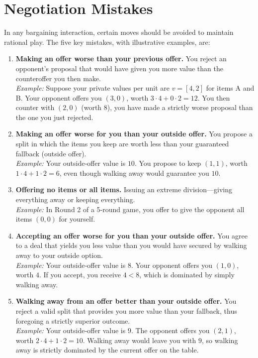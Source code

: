 \section{Negotiation Mistakes}
\label{app:mistakes}

In any bargaining interaction, certain moves should be avoided to maintain rational play.  The five key mistakes, with illustrative examples, are:

\begin{enumerate}

  \item \textbf{Making an offer worse than your previous offer.}  
    You reject an opponent’s proposal that would have given you more value than the counteroffer you then make.  
    \\
    \textit{Example:} Suppose your private values per unit are $v=[4,2]$ for items A and B.  Your opponent offers you $(3,0)$, worth $3\cdot4 + 0\cdot2 = 12$. You then counter with $(2,0)$ (worth $8$), you have made a strictly worse proposal than the one you just rejected.

  \item \textbf{Making an offer worse for you than your outside offer.}  
    You propose a split in which the items you keep are worth less than your guaranteed fallback (outside offer).  
    \\
    \textit{Example:} Your outside‐offer value is $10$.  You propose to keep $(1,1)$, worth $1\cdot4 + 1\cdot2 = 6$, even though walking away would guarantee you $10$. 

  \item \textbf{Offering no items or all items.}  
    Issuing an extreme division—giving everything away or keeping everything.  
    \\
    \textit{Example:} In Round 2 of a 5‐round game, you offer to give the opponent all items $(0,0)$ for yourself. 

  \item \textbf{Accepting an offer worse for you than your outside offer.}  
    You agree to a deal that yields you less value than you would have secured by walking away to your outside option.  
    \\
    \textit{Example:} Your outside‐offer value is $8$.  Your opponent offers you $(1,0)$, worth $4$.  If you accept, you receive $4<8$, which is dominated by simply walking away.

  \item \textbf{Walking away from an offer better than your outside offer.}  
    You reject a valid split that provides you more value than your fallback, thus foregoing a strictly superior outcome.  
    \\
    \textit{Example:} Your outside‐offer value is $9$.  The opponent offers you $(2,1)$, worth $2\cdot4 + 1\cdot2 = 10$.  Walking away would leave you with $9$, so walking away is strictly dominated by the current offer on the table. 
  
\end{enumerate}


